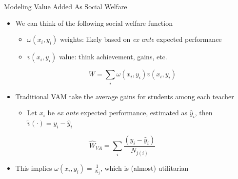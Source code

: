 \documentclass[11pt]{beamer}
\begin{document}

\begin{frame}{Modeling Value Added As Social Welfare}

\begin{itemize}
    \item We can think of the following social welfare function
    \begin{itemize}
        \item $\omega(x_i,y_i)$ weights: likely based on \textit{ex ante} expected performance
        \item $v(x_i,y_i)$ value: think achievement, gains, etc.
    \end{itemize}
    \[
    W  = \sum_i \omega(x_i,y_i) v(x_i,y_i) 
    \] 
    
    \item Traditional VAM take the average gains for students among each teacher
    \begin{itemize}
        \item Let $x_i$ be \textit{ex ante} expected performance, estimated as $\hat{y}_i$, then $\tilde{v}(\cdot) = y_i - \hat{y}_i$
    \end{itemize}
    \[
    \hat{W}_{VA}  = \sum_i \frac{(y_i-\hat{y}_i)}{N_{j(i)}} \hspace{3em}
    \]
    
    \item This implies $\omega(x_i,y_i)=\frac{1}{N_j}$, which is (almost) utilitarian

\end{itemize}


\end{frame}


\end{document}
